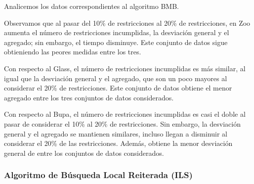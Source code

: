 Analicemos los datos correspondientes al algoritmo BMB. 

Observamos que al pasar del 10\% de restricciones al 20\% de restricciones, en Zoo aumenta el número de restricciones incumplidas, la desviación general y el agregado; sin embargo, el tiempo disminuye.
Este conjunto de datos sigue obtieniendo las peores medidas entre los tres.

Con respecto al Glass, el número de restricciones incumplidas es más similar, al igual que la desviación general y el agregado, que son un poco mayores al considerar el 20\% de restricciones.
Este conjunto de datos obtiene el menor agregado entre los tres conjuntos de datos considerados.

Con respecto al Bupa, el número de restricciones incumplidas es casi el doble al pasar de considerar el 10\% al 20\% de restricciones. Sin embargo, la desviación general y el agregado se mantienen similares, incluso 
llegan a disminuir al considerar el 20\% de las restricciones. 
Además, obtiene la menor desviación general de entre los conjuntos de datos considerados.

\subsubsection{Algoritmo de Búsqueda Local Reiterada (ILS)}

